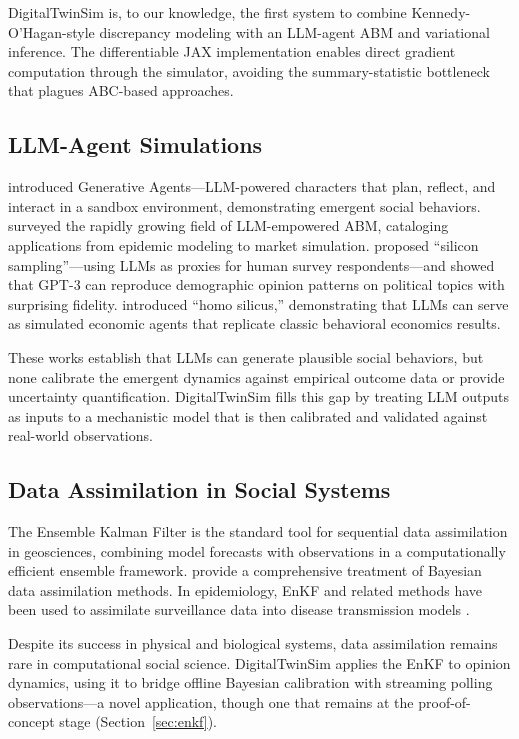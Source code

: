 \documentclass[12pt]{article}
\begin{document}
DigitalTwinSim is, to our knowledge, the first system to combine Kennedy-O'Hagan-style discrepancy modeling with an LLM-agent ABM and variational inference. The differentiable JAX implementation enables direct gradient computation through the simulator, avoiding the summary-statistic bottleneck that plagues ABC-based approaches.

\subsection{LLM-Agent Simulations}

\citet{park2023} introduced Generative Agents---LLM-powered characters that plan, reflect, and interact in a sandbox environment, demonstrating emergent social behaviors. \citet{gao2023} surveyed the rapidly growing field of LLM-empowered ABM, cataloging applications from epidemic modeling to market simulation. \citet{argyle2023} proposed ``silicon sampling''---using LLMs as proxies for human survey respondents---and showed that GPT-3 can reproduce demographic opinion patterns on political topics with surprising fidelity. \citet{horton2023} introduced ``homo silicus,'' demonstrating that LLMs can serve as simulated economic agents that replicate classic behavioral economics results.

These works establish that LLMs can generate plausible social behaviors, but none calibrate the emergent dynamics against empirical outcome data or provide uncertainty quantification. DigitalTwinSim fills this gap by treating LLM outputs as inputs to a mechanistic model that is then calibrated and validated against real-world observations.

\subsection{Data Assimilation in Social Systems}

The Ensemble Kalman Filter \citep{evensen2003} is the standard tool for sequential data assimilation in geosciences, combining model forecasts with observations in a computationally efficient ensemble framework. \citet{reich2015} provide a comprehensive treatment of Bayesian data assimilation methods. In epidemiology, EnKF and related methods have been used to assimilate surveillance data into disease transmission models \citep{mistry2021}.

Despite its success in physical and biological systems, data assimilation remains rare in computational social science. DigitalTwinSim applies the EnKF to opinion dynamics, using it to bridge offline Bayesian calibration with streaming polling observations---a novel application, though one that remains at the proof-of-concept stage (Section~\ref{sec:enkf}).
\end{document}
